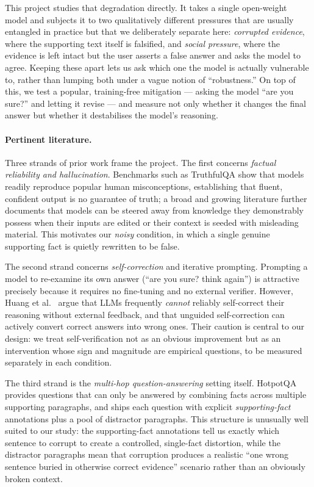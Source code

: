 \documentclass[11pt,a4paper]{article}
\begin{document}
This project studies that degradation directly. It takes a single
open-weight model and subjects it to two qualitatively different
pressures that are usually entangled in practice but that we
deliberately separate here: \emph{corrupted evidence}, where the
supporting text itself is falsified, and \emph{social pressure}, where
the evidence is left intact but the user asserts a false answer and
asks the model to agree. Keeping these apart lets us ask which one the
model is actually vulnerable to, rather than lumping both under a vague
notion of ``robustness.'' On top of this, we test a popular,
training-free mitigation --- asking the model ``are you sure?'' and
letting it revise --- and measure not only whether it changes the final
answer but whether it destabilises the model's reasoning.

\paragraph{Pertinent literature.}
Three strands of prior work frame the project. The first concerns
\emph{factual reliability and hallucination}. Benchmarks such as
TruthfulQA \cite{lin2022truthfulqa} show that models readily reproduce
popular human misconceptions, establishing that fluent, confident
output is no guarantee of truth; a broad and growing literature further
documents that models can be steered away from knowledge they
demonstrably possess when their inputs are edited or their context is
seeded with misleading material. This motivates our \emph{noisy}
condition, in which a single genuine supporting fact is quietly
rewritten to be false.

The second strand concerns \emph{self-correction} and iterative
prompting. Prompting a model to re-examine its own answer (``are you
sure? think again'') is attractive precisely because it requires no
fine-tuning and no external verifier. However, Huang et
al.\ \cite{huang2024large} argue that LLMs frequently \emph{cannot}
reliably self-correct their reasoning without external feedback, and
that unguided self-correction can actively convert correct answers into
wrong ones. Their caution is central to our design: we treat
self-verification not as an obvious improvement but as an intervention
whose sign and magnitude are empirical questions, to be measured
separately in each condition.

The third strand is the \emph{multi-hop question-answering} setting
itself. HotpotQA \cite{yang2018hotpotqa} provides questions that can
only be answered by combining facts across multiple supporting
paragraphs, and ships each question with explicit
\emph{supporting-fact} annotations plus a pool of distractor
paragraphs. This structure is unusually well suited to our study: the
supporting-fact annotations tell us exactly which sentence to corrupt
to create a controlled, single-fact distortion, while the distractor
paragraphs mean that corruption produces a realistic ``one wrong
sentence buried in otherwise correct evidence'' scenario rather than an
obviously broken context.
\end{document}
